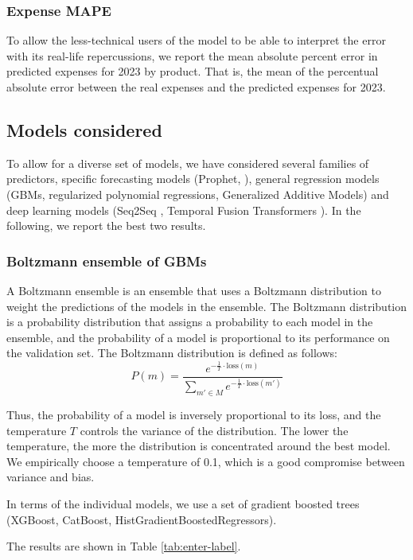 \documentclass[11pt,twocolumn]{article}
\begin{document}
\subsubsection{Expense MAPE}
To allow the less-technical users of the model to be able to interpret the error with its real-life repercussions, we report the mean absolute percent error in predicted expenses for 2023 by product. That is, the mean of the percentual absolute error between the real expenses and the predicted expenses for 2023.

\subsection{Models considered}
To allow for a diverse set of models, we have considered several families of predictors, specific forecasting models (Prophet, \cite{key6}), general regression models (GBMs, regularized polynomial regressions, Generalized Additive Models) and deep learning models (Seq2Seq \cite{key7}, Temporal Fusion Transformers \cite{key4}). In the following, we report the best two results.

\subsubsection{Boltzmann ensemble of GBMs}
A Boltzmann ensemble is an ensemble that uses a Boltzmann distribution to weight the predictions of the models in the ensemble. The Boltzmann distribution is a probability distribution that assigns a probability to each model in the ensemble, and the probability of a model is proportional to its performance on the validation set. The Boltzmann distribution is defined as follows:
\begin{equation*}
	P\left( m \right) = \frac{e^{-\frac{1}{T} \cdot \text{loss}\left( m \right) }}{\sum_{m' \in M}^{} e^{-\frac{1}{T} \cdot \text{loss}\left( m' \right) }}
\end{equation*}

Thus, the probability of a model is inversely proportional to its loss, and the temperature $T$ controls the variance of the distribution. The lower the temperature, the more the distribution is concentrated around the best model. We empirically choose a temperature of 0.1, which is a good compromise between variance and bias.

In terms of the individual models, we use a set of gradient boosted trees (XGBoost, CatBoost, HistGradientBoostedRegressors).

The results are shown in Table \ref{tab:enter-label}.
\end{document}

